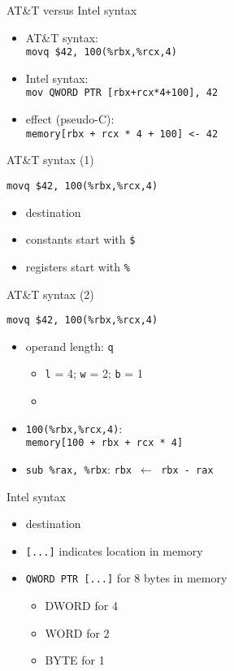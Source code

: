 
\begin{frame}{AT\&T versus Intel syntax}
    \begin{itemize}
    \item AT\&T syntax: \\ {\tt movq \$42, 100(\%rbx,\%rcx,4)}
    \item Intel syntax: \\ {\tt mov QWORD PTR [rbx+rcx*4+100], 42}
    \item effect (pseudo-C): \\ {\tt memory[rbx + rcx * 4 + 100] <- 42}
    \end{itemize}
\end{frame}

\begin{frame}[fragile,label=att1]{AT\&T syntax (1)}
\begin{lstlisting}
movq $42, 100(%rbx,%rcx,4)
\end{lstlisting}
    \begin{itemize}
    \item destination 
    \item constants start with {\tt \$}
    \item registers start with {\tt \%}
    \end{itemize}
\end{frame}

\begin{frame}[fragile,label=att2]{AT\&T syntax (2)}
\begin{lstlisting}
movq $42, 100(%rbx,%rcx,4)
\end{lstlisting}
    \begin{itemize}
    \item operand length: {\tt q}
        \begin{itemize}
        \item {\tt l} = 4; {\tt w} = 2; {\tt b} = 1
        \item 
        \end{itemize}
    \item {\tt 100(\%rbx,\%rcx,4)}: \\ {\tt memory[100 + rbx + rcx * 4]}
    \item {\tt sub \%rax, \%rbx}: {\tt rbx $\leftarrow$ rbx - rax}
    \end{itemize}
\end{frame}

\begin{frame}{Intel syntax}
    \begin{itemize}
    \item destination 
    \item {\tt [...]} indicates location in memory
    \item {\tt QWORD PTR [...]} for 8 bytes in memory
        \begin{itemize}
        \item DWORD for 4
        \item WORD for 2
        \item BYTE for 1
        \end{itemize}
    \end{itemize}
\end{frame}


